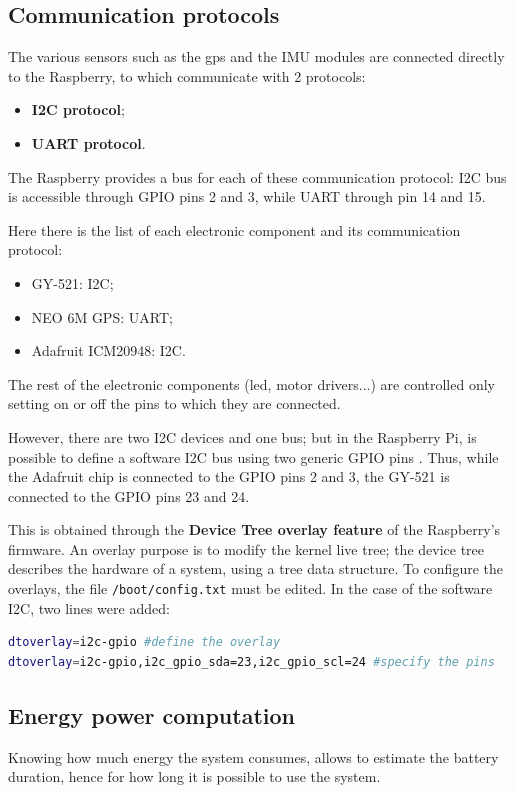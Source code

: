 \documentclass[]{article}
\begin{document}
\subsection{Communication protocols}\label{sec:communication}
The various sensors such as the gps and the IMU modules are connected directly to the Raspberry, to which communicate with 2 protocols:

\begin{itemize}
	\item \textbf{I2C protocol};
	\item \textbf{UART protocol}.
\end{itemize}

The Raspberry provides a bus for each of these communication protocol: I2C bus is accessible through GPIO pins 2 and 3, while UART through pin 14 and 15. 

Here there is the list of each electronic component and its communication protocol:
\begin{itemize}
	\item GY-521: I2C;
	\item NEO 6M GPS: UART;
	\item Adafruit ICM20948: I2C.
\end{itemize}

The rest of the electronic components (led, motor drivers...) are controlled only setting on or off the pins to which they are connected.

However, there are two I2C devices and one bus; but in the Raspberry Pi, is possible to define a software I2C bus using two generic GPIO pins \cite{i2cadafruit}. Thus, while the Adafruit chip is connected to the GPIO pins 2 and 3, the GY-521 is connected to the GPIO pins 23 and 24. 

This is obtained through the \textbf{Device Tree overlay feature} of the Raspberry's firmware. An overlay purpose is to modify the kernel live tree; the device tree describes the hardware of a system, using a tree data structure. To configure the overlays, the file \texttt{/boot/config.txt} must be edited. In the case of the software I2C, two lines were added:

\begin{lstlisting}[language=Bash, caption={Additional lines in \texttt{/boot/config.txt} to add a software I2C overlay.}]
dtoverlay=i2c-gpio #define the overlay
dtoverlay=i2c-gpio,i2c_gpio_sda=23,i2c_gpio_scl=24 #specify the pins
\end{lstlisting}

\subsection{Energy power computation}
Knowing how much energy the system consumes, allows to estimate the battery duration, hence for how long it is possible to use the system.
\end{document}
